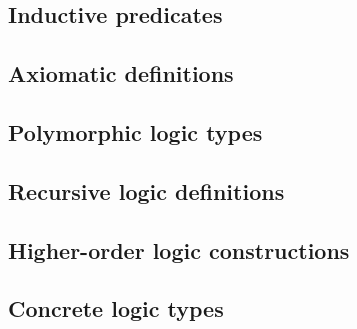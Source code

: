 

\subsection{Inductive predicates}
\label{sec:inductivepredicates}

\absent


\subsection{Axiomatic definitions}

\absent


\subsection{Polymorphic logic types}\label{sec:polym-logic-types}

\absent


\subsection{Recursive logic definitions}

\nodiff


\subsection{Higher-order logic constructions}
\label{sec:higherorder}

\absent


\subsection{Concrete logic types}\label{sec:concrete-logic-types}

